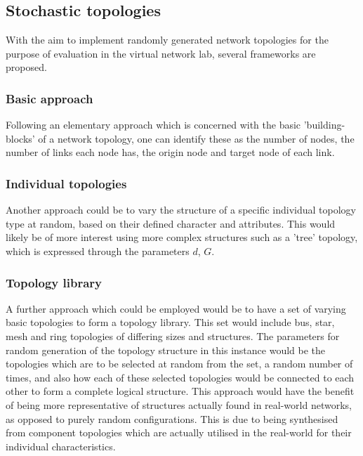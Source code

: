 \subsection{Stochastic topologies}
With the aim to implement randomly generated network topologies for the purpose of evaluation in the virtual network lab, several frameworks are proposed.

\subsubsection{Basic approach}
Following an elementary approach which is concerned with the basic 'building-blocks' of a network topology, one can identify these as the number of nodes, the number of links each node has, the origin node and target node of each link. 

\subsubsection{Individual topologies}
Another approach could be to vary the structure of a specific individual topology type at random, based on their defined character and attributes. This would likely be of more interest using more complex structures such as a 'tree' topology, which is expressed through the parameters $d$, $G$.

\subsubsection{Topology library}
A further approach which could be employed would be to have a set of varying basic topologies to form a topology library. This set would include bus, star, mesh and ring topologies of differing sizes and structures. The parameters for random generation of the topology structure in this instance would be the topologies which are to be selected at random from the set, a random number of times, and also how each of these selected topologies would be connected to each other to form a complete logical structure. This approach would have the benefit of being more representative of structures actually found in real-world networks, as opposed to purely random configurations. This is due to being synthesised from component topologies which are actually utilised in the real-world for their individual characteristics.

